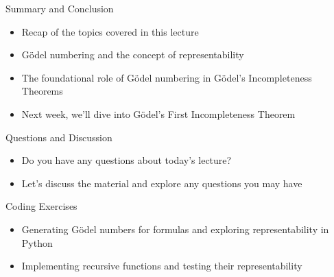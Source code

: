 \documentclass[presentation]{beamer}
\begin{document}
\begin{frame}[label={sec:org36f0141}]{Summary and Conclusion}
\begin{itemize}
\item Recap of the topics covered in this lecture
\item Gödel numbering and the concept of representability
\item The foundational role of Gödel numbering in Gödel's Incompleteness Theorems
\item Next week, we'll dive into Gödel's First Incompleteness Theorem
\end{itemize}
\end{frame}

\begin{frame}[label={sec:org12578bb}]{Questions and Discussion}
\begin{itemize}
\item Do you have any questions about today's lecture?
\item Let's discuss the material and explore any questions you may have
\end{itemize}
\end{frame}

\begin{frame}[label={sec:orgbd2d1bb}]{Coding Exercises}
\begin{itemize}
\item Generating Gödel numbers for formulas and exploring representability in Python
\item Implementing recursive functions and testing their representability
\end{itemize}
\end{frame}
\end{document}
